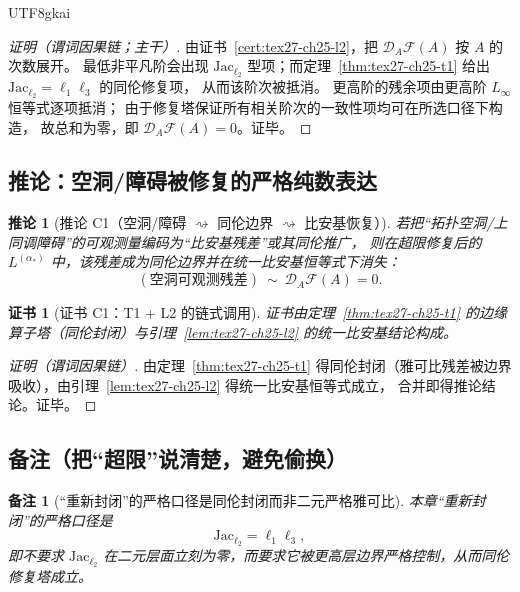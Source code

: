\documentclass[12pt]{article}
\newtheorem{corollary}{推论}[section]
\newtheorem{remark}{备注}[section]
\newtheorem{Certificate}{证书}[section]
\begin{document}
\begin{CJK*}{UTF8}{gkai}
\begin{proof}[证明（谓词因果链；主干）]
由证书~\ref{cert:tex27-ch25-l2}，把 $\mathcal{D}_A\mathcal{F}(A)$ 按 $A$ 的次数展开。
最低非平凡阶会出现 $\mathrm{Jac}_{\ell_2}$ 型项；而定理~\ref{thm:tex27-ch25-t1} 给出
$\mathrm{Jac}_{\ell_2}=\ell_1\ell_3$ 的同伦修复项，
从而该阶次被抵消。
更高阶的残余项由更高阶 $L_\infty$ 恒等式逐项抵消；
由于修复塔保证所有相关阶次的一致性项均可在所选口径下构造，
故总和为零，即 $\mathcal{D}_A\mathcal{F}(A)=0$。证毕。
\end{proof}

\subsection{推论：空洞/障碍被修复的严格纯数表达}
\label{subsec:tex27-ch25-cor}

\begin{corollary}[推论 C1（空洞/障碍 $\rightsquigarrow$ 同伦边界 $\rightsquigarrow$ 比安基恢复）]
\label{cor:tex27-ch25-c1}
若把“拓扑空洞/上同调障碍”的可观测量编码为“比安基残差”或其同伦推广，
则在超限修复后的 $L^{(\alpha_\ast)}$ 中，该残差成为同伦边界并在统一比安基恒等式下消失：
\[
  (\text{空洞可观测残差})
  \ \sim\
  \mathcal{D}_A\mathcal{F}(A)=0.
\]
\end{corollary}

\begin{Certificate}[证书 C1：T1 + L2 的链式调用]
\label{cert:tex27-ch25-c1}
证书由定理~\ref{thm:tex27-ch25-t1} 的边缘算子塔（同伦封闭）与引理~\ref{lem:tex27-ch25-l2} 的统一比安基结论构成。
\end{Certificate}

\begin{proof}[证明（谓词因果链）]
由定理~\ref{thm:tex27-ch25-t1} 得同伦封闭（雅可比残差被边界吸收），由引理~\ref{lem:tex27-ch25-l2} 得统一比安基恒等式成立，
合并即得推论结论。证毕。
\end{proof}

\subsection{备注（把“超限”说清楚，避免偷换）}
\label{subsec:tex27-ch25-remarks}

\begin{remark}[“重新封闭”的严格口径是同伦封闭而非二元严格雅可比]
本章“重新封闭”的严格口径是
\[
  \mathrm{Jac}_{\ell_2}=\ell_1\ell_3,
\]
即不要求 $\mathrm{Jac}_{\ell_2}$ 在二元层面立刻为零，而要求它被更高层边界严格控制，从而同伦修复塔成立。
\end{remark}


\end{CJK*}
\end{document}

